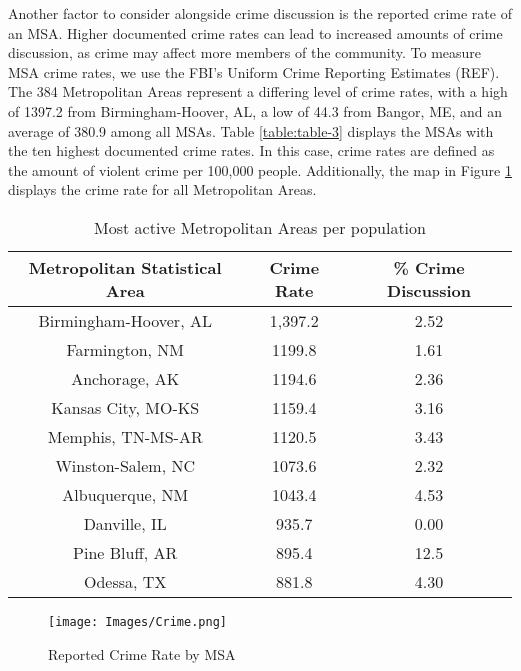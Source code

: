 \documentclass[12pt,oneside, letterpaper]{book}
\begin{document}
\par Another factor to consider alongside crime discussion is the reported crime rate of an MSA. Higher documented crime rates can lead to increased amounts of crime discussion, as crime may affect more members of the community. To measure MSA crime rates, we use the FBI's Uniform Crime Reporting Estimates (REF). The 384 Metropolitan Areas represent a differing level of crime rates, with a high of 1397.2 from Birmingham-Hoover, AL, a low of 44.3 from Bangor, ME, and an average of 380.9 among all MSAs. Table \ref{table:table-3} displays the MSAs with the ten highest documented crime rates. In this case, crime rates are defined as the amount of violent crime per 100,000 people. Additionally, the map in Figure \ref{fig:map-3} displays the crime rate for all Metropolitan Areas.

\begin{table}[h!]
    \centering
    \small
    \caption{Most active Metropolitan Areas per population}
    \begin{tabular}{| c | c | c |}
    \hline
    Metropolitan Statistical Area & Crime Rate & \% Crime Discussion\\ \hline
    Birmingham-Hoover, AL & 1,397.2 & 2.52 \\ \hline
    Farmington, NM & 1199.8 & 1.61 \\ \hline
    Anchorage, AK & 1194.6 & 2.36 \\ \hline
    Kansas City, MO-KS & 1159.4 & 3.16 \\ \hline
    Memphis, TN-MS-AR & 1120.5 & 3.43 \\ \hline
    Winston-Salem, NC & 1073.6 & 2.32 \\ \hline
    Albuquerque, NM & 1043.4 & 4.53 \\ \hline
    Danville, IL & 935.7 & 0.00 \\ \hline
    Pine Bluff, AR & 895.4 & 12.5 \\ \hline
    Odessa, TX & 881.8 & 4.30 \\ \hline
	\end{tabular}
	\label{table:table-4}
\end{table}

\begin{figure}[ht]
    \centering
    \texttt{[image: Images/Crime.png]}
    \caption{Reported Crime Rate by MSA}
    \label{fig:map-3}
\end{figure}
\end{document}
